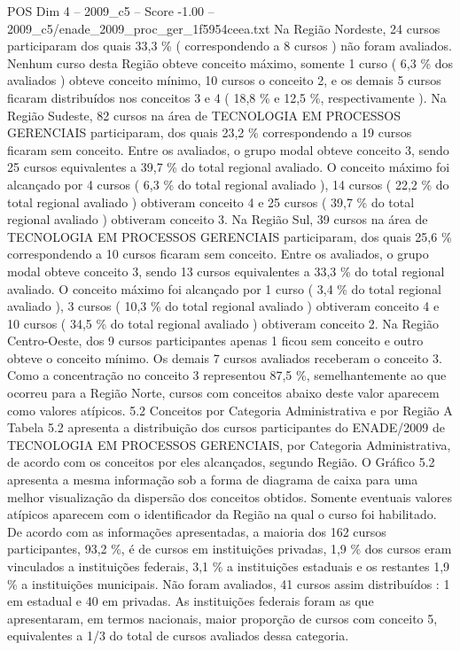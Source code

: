 \begin{textsample}{POS Dim 4 – 2009\_c5 – Score -1.00 – 2009\_c5/enade\_2009\_proc\_ger\_1f5954ceea.txt}
Na Região Nordeste, 24 cursos participaram dos quais 33,3 \% ( correspondendo a 8 cursos ) não foram avaliados.
Nenhum curso desta Região obteve conceito máximo, somente 1 curso ( 6,3 \% dos avaliados ) obteve conceito mínimo, 10 cursos o conceito 2, e os demais 5 cursos ficaram distribuídos nos conceitos 3 e 4 ( 18,8 \% e 12,5 \%, respectivamente ).
Na Região Sudeste, 82 cursos na área de TECNOLOGIA EM PROCESSOS GERENCIAIS participaram, dos quais 23,2 \% correspondendo a 19 cursos ficaram sem conceito.
Entre os avaliados, o grupo modal obteve conceito 3, sendo 25 cursos equivalentes a 39,7 \% do total regional avaliado.
O conceito máximo foi alcançado por 4 cursos ( 6,3 \% do total regional avaliado ), 14 cursos ( 22,2 \% do total regional avaliado ) obtiveram conceito 4 e 25 cursos ( 39,7 \% do total regional avaliado ) obtiveram conceito 3.
Na Região Sul, 39 cursos na área de TECNOLOGIA EM PROCESSOS GERENCIAIS participaram, dos quais 25,6 \% correspondendo a 10 cursos ficaram sem conceito.
Entre os avaliados, o grupo modal obteve conceito 3, sendo 13 cursos equivalentes a 33,3 \% do total regional avaliado.
O conceito máximo foi alcançado por 1 curso ( 3,4 \% do total regional avaliado ), 3 cursos ( 10,3 \% do total regional avaliado ) obtiveram conceito 4 e 10 cursos ( 34,5 \% do total regional avaliado ) obtiveram conceito 2.
Na Região Centro-Oeste, dos 9 cursos participantes apenas 1 ficou sem conceito e outro obteve o conceito mínimo.
Os demais 7 cursos avaliados receberam o conceito 3.
Como a concentração no conceito 3 representou 87,5 \%, semelhantemente ao que ocorreu para a Região Norte, cursos com conceitos abaixo deste valor aparecem como valores atípicos. 5.2 Conceitos por Categoria Administrativa e por Região A Tabela 5.2 apresenta a distribuição dos cursos participantes do ENADE/2009 de TECNOLOGIA EM PROCESSOS GERENCIAIS, por Categoria Administrativa, de acordo com os conceitos por eles alcançados, segundo Região.
O Gráfico 5.2 apresenta a mesma informação sob a forma de diagrama de caixa para uma melhor visualização da dispersão dos conceitos obtidos.
Somente eventuais valores atípicos aparecem com o identificador da Região na qual o curso foi habilitado.
De acordo com as informações apresentadas, a maioria dos 162 cursos participantes, 93,2 \%, é de cursos em instituições privadas, 1,9 \% dos cursos eram vinculados a instituições federais, 3,1 \% a instituições estaduais e os restantes 1,9 \% a instituições municipais.
Não foram avaliados, 41 cursos assim distribuídos : 1 em estadual e 40 em privadas.
As instituições federais foram as que apresentaram, em termos nacionais, maior proporção de cursos com conceito 5, equivalentes a 1/3 do total de cursos avaliados dessa categoria.

\end{textsample}
